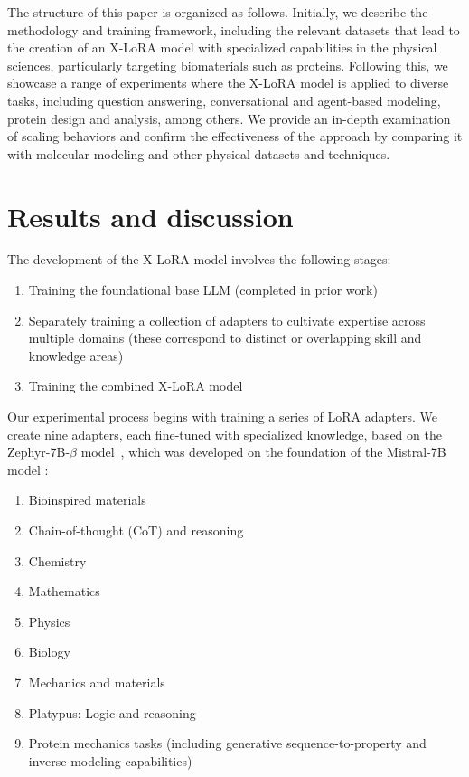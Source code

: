 The structure of this paper is organized as follows. Initially, we describe the methodology and training framework, including the relevant datasets that lead to the creation of an X-LoRA model with specialized capabilities in the physical sciences, particularly targeting biomaterials such as proteins. Following this, we showcase a range of experiments where the X-LoRA model is applied to diverse tasks, including question answering, conversational and agent-based modeling, protein design and analysis, among others. We provide an in-depth examination of scaling behaviors and confirm the effectiveness of the approach by comparing it with molecular modeling and other physical datasets and techniques.

\section{Results and discussion}

The development of the X-LoRA model involves the following stages:

\begin{enumerate}
    \item Training the foundational base LLM (completed in prior work) \item Separately training a collection of adapters to cultivate expertise across multiple domains (these correspond to distinct or overlapping skill and knowledge areas) \item Training the combined X-LoRA model
\end{enumerate}

Our experimental process begins with training a series of LoRA adapters. We create nine adapters, each fine-tuned with specialized knowledge, based on the Zephyr-7B-$\beta$ model~\cite{HuggingFaceH4/zephyr-7b-betaFace}, which was developed on the foundation of the Mistral-7B model \cite{Jiang2023Mistral7B}:

\begin{enumerate}
    \item Bioinspired materials \item Chain-of-thought (CoT) and reasoning \item Chemistry \item Mathematics \item Physics \item Biology \item Mechanics and materials \item Platypus: Logic and reasoning \item Protein mechanics tasks (including generative sequence-to-property and inverse modeling capabilities)
\end{enumerate}

